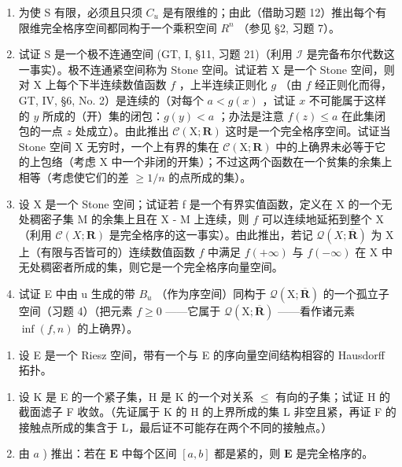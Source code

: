 \begin{enumerate}
\def\labelenumi{\alph{enumi})}
\setcounter{enumi}{4}
\item
  为使 S 有限，必须且只须 \(C_{u}\) 是有限维的；由此（借助习题 12）推出每个有限维完全格序空间都同构于一个乘积空间 \(R^{n}\) （参见 §2, 习题 7）。
\item
  试证 S 是一个极不连通空间 (GT, I, §11, 习题 21)（利用 \(\mathcal{I}\) 是完备布尔代数这一事实）。极不连通紧空间称为 Stone 空间。试证若 X 是一个 Stone 空间，则对 X 上每个下半连续数值函数 \(f\) ，上半连续正则化 \(g\) （由 \(f\) 经正则化而得，GT, IV, §6, No. 2）是连续的（对每个 \(a < g(x)\) ，试证 \(x\) 不可能属于这样的 \(y\) 所成的（开）集的闭包：\(g(y) < a\) ；办法是注意 \(f(z) \leqslant a\) 在此集闭包的一点 \(z\) 处成立）。由此推出 \(\mathcal{C}(\mathrm{X};\mathbf{R})\) 这时是一个完全格序空间。试证当 Stone 空间 X 无穷时，一个上有界的集在 \(\mathcal{C}(\mathrm{X};\mathbf{R})\) 中的上确界未必等于它的上包络（考虑 X 中一个非闭的开集）；不过这两个函数在一个贫集的余集上相等（考虑使它们的差 \(\geqslant 1/n\) 的点所成的集）。
\item
  设 X 是一个 Stone 空间；试证若 f 是一个有界实值函数，定义在 X 的一个无处稠密子集 M 的余集上且在 X - M 上连续，则 \(f\) 可以连续地延拓到整个 X（利用 \(\mathcal{C}(X; \mathbf{R})\) 是完全格序的这一事实）。由此推出，若记 \(\mathcal{Q}(X; \overline{\mathbf{R}})\) 为 X 上（有限与否皆可的）连续数值函数 \(f\) 中满足 \(f(+\infty)\) 与 \(f(-\infty)\) 在 X 中无处稠密者所成的集，则它是一个完全格序向量空间。
\item
  试证 E 中由 u 生成的带 \(B_{u}\) （作为序空间）同构于 \(\mathcal{Q}(\mathrm{X};\overline{\mathbf{R}})\) 的一个孤立子空间（习题 4）（把元素 \(f \geqslant 0\) ——它属于 \(\mathcal{Q}(\mathrm{X};\overline{\mathbf{R}})\) ——看作诸元素 \(\inf(f,n)\) 的上确界）。
\end{enumerate}

\begin{enumerate}
\def\labelenumi{\arabic{enumi})}
\setcounter{enumi}{13}
\tightlist
\item
  设 E 是一个 Riesz 空间，带有一个与 E 的序向量空间结构相容的 Hausdorff 拓扑。
\end{enumerate}

\begin{enumerate}
\def\labelenumi{\alph{enumi})}
\item
  设 K 是 E 的一个紧子集，H 是 K 的一个对关系 \(\leqslant\) 有向的子集；试证 H 的截面滤子 F 收敛。（先证属于 K 的 H 的上界所成的集 L 非空且紧，再证 F 的接触点所成的集含于 L，最后证不可能存在两个不同的接触点。）
\item
  由 \(a\) ) 推出：若在 \(\mathbf{E}\) 中每个区间 \([a,b]\) 都是紧的，则 \(\mathbf{E}\) 是完全格序的。
\end{enumerate}

\setcounter{exercisegroup}{2}
\edef\CurrentExerciseGroup{\arabic{exercisegroup}}

